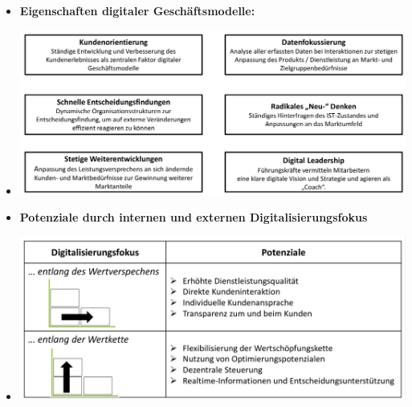 \documentclass[12pt,a4paper]{article}
\begin{document}
\begin{itemize}
   \item \textbf{Eigenschaften digitaler Geschäftsmodelle:}
   \item[] \includegraphics[scale=0.4]{edg.png}
   
   
   \newpage
   \item \textbf{Potenziale durch internen und externen Digitalisierungsfokus}
   \item[] \includegraphics[scale=0.45]{potdig.png}
   

\end{itemize}
\end{document}
